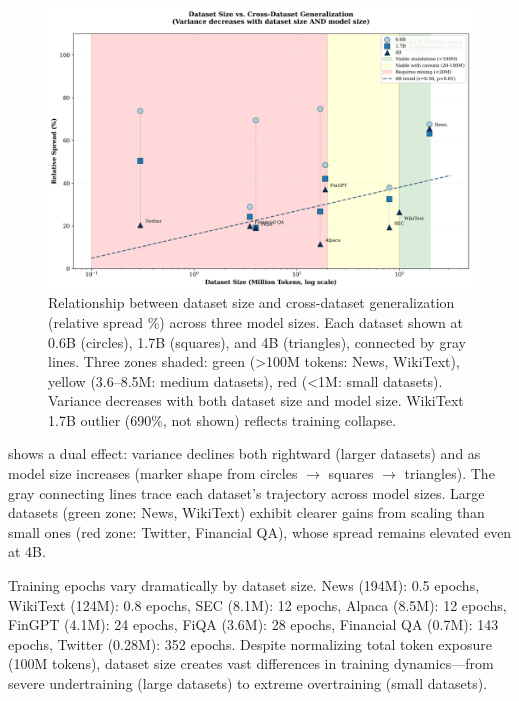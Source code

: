 \begin{figure}[h]
\centering
\includegraphics[width=\textwidth]{figures/scatter_size_variance.png}
\caption[Dataset Size vs. Generalization Across Model Scales]{Relationship between dataset size and cross-dataset generalization (relative spread \%) across three model sizes. Each dataset shown at 0.6B (circles), 1.7B (squares), and 4B (triangles), connected by gray lines. Three zones shaded: green (>100M tokens: News, WikiText), yellow (3.6–8.5M: medium datasets), red (<1M: small datasets). Variance decreases with both dataset size and model size. WikiText 1.7B outlier (690\%, not shown) reflects training collapse.}
\label{fig:scatter_size_variance}
\end{figure}

 shows a dual effect: variance declines both rightward (larger datasets) and as model size increases (marker shape from circles \(\to\) squares \(\to\) triangles). The gray connecting lines trace each dataset's trajectory across model sizes. Large datasets (green zone: News, WikiText) exhibit clearer gains from scaling than small ones (red zone: Twitter, Financial QA), whose spread remains elevated even at 4B.

Training epochs vary dramatically by dataset size. News (194M): 0.5 epochs, WikiText (124M): 0.8 epochs, SEC (8.1M): 12 epochs, Alpaca (8.5M): 12 epochs, FinGPT (4.1M): 24 epochs, FiQA (3.6M): 28 epochs, Financial QA (0.7M): 143 epochs, Twitter (0.28M): 352 epochs. Despite normalizing total token exposure (100M tokens), dataset size creates vast differences in training dynamics—from severe undertraining (large datasets) to extreme overtraining (small datasets).

